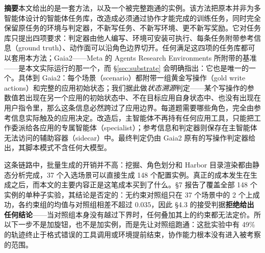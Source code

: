 \documentclass[UTF8,11pt,fontset=fandol]{ctexart}
\begin{document}
\hypersetup{pageanchor=false}
\thispagestyle{empty}

\vspace*{1.5cm}

\vspace{0.55cm}

\vspace{0.9cm}
\vspace{0.35em}
\vspace{0.2em}

\vspace{0.5cm}
\noindent{\color{rulegray}\rule{0.32\textwidth}{0.4pt}}

\vspace{0.45cm}
\noindent\begin{minipage}{0.9\textwidth}
\setlength{\parindent}{0pt}
{\bfseries 摘要}\hspace{0.6em}本文给出的是一套方法，以及一个被完整跑通的实例。该方法把原本并非为多智能体设计的智能体任务库，改造成必须通过协作才能完成的训练任务，同时完全保留原任务的环境与判定器，不新写任务、不新写环境、更不新写奖励。它对任务库只提出四项要求：判定器由他人编写、环境可安装可执行、每条任务附带参考信息（ground truth）、动作面可以沿角色边界切开。任何满足这四项的任务库都可以套用本方法；Gaia2——Meta 的 Agents Research Environments 所附带的基准\cite{meta2025are}——是本文实际运行的那一个，而 \S\ref{sec:substrate} 会明确指出：它也是唯一的一个。具体到 Gaia2：每个场景（scenario）都附带一组黄金写操作（gold write actions）和完整的应用初始状态；我们据此做\emph{状态溯源}判定——某个写操作的参数值若出现在另一个应用的初始状态中、不在目标应用自身状态中、也没有出现在用户指令里，那么这条信息必然跨过了应用边界。每道题需要哪些角色，完全由参考信息实际触及的应用决定。改造后，主智能体不再持有任何应用工具，只能把工作委派给各应用的专属智能体（specialist）；参考信息和判定器则保存在主智能体无法访问的辅助容器（sidecar）中。最终判定仍由 Gaia2 原有的写操作判定器给出，其脚本模式不含任何大模型。

\vspace{0.5em}
这条链路中，批量生成的开销并不高：挖掘、角色划分和 Harbor 目录渲染都由静态分析完成，37 个入选场景可以直接生成 148 个配置实例。真正的成本发生在生成之后，而本文的主要内容正是这笔成本买到了什么。\S7 报告了覆盖全部 148 个实例的单种子实验，其结论是否定的：无约束对照组只在 37 个场景中的 2 个上成功，各约束组的均值与对照组相差不超过 $0.035$，因此 \S4.3 的接受判据\textbf{拒绝给出任何结论}——当对照组本身没有越过下界时，任何叠加其上的约束都无法定价。所以下一步不是加旋钮，也不是加实例，而是先让对照组跑通：这批实验中有 49\% 的轨迹终止于格式错误的工具调用或环境提前结束，协作能力根本没有进入被考察的范围。
\end{minipage}
\end{document}

